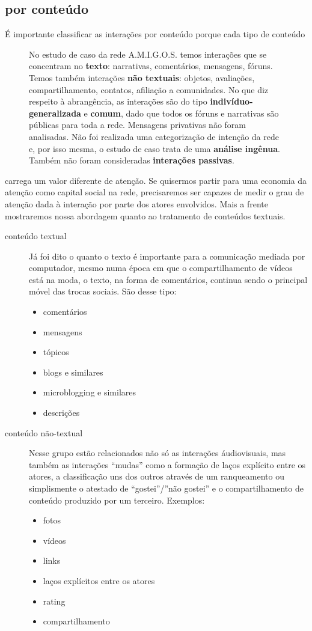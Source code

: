 \documentclass{article}
\begin{document}
\subsection{por conteúdo}
É importante classificar as interações por conteúdo porque cada tipo de conteúdo\begin{figure}
\begin{boxedminipage}{2in}
No estudo de caso da rede A.M.I.G.O.S. temos interações que se concentram no
\textbf{texto}: narrativas, comentários, mensagens, fóruns. Temos também
interações \textbf{não textuais}: objetos, avaliações, compartilhamento,
contatos, afiliação a comunidades. No que diz respeito à abrangência, as
interações são do tipo \textbf{indivíduo-generalizada} e \textbf{comum}, dado
que todos os fóruns e narrativas são públicas para toda a rede. Mensagens
privativas não foram analisadas. Não foi realizada uma categorização de
intenção da rede e, por isso mesma, o estudo de caso trata de uma
\textbf{análise ingênua}. Também não foram consideradas \textbf{interações
passivas}.
\end{boxedminipage}
\end{figure}carrega um valor diferente de atenção. Se quisermos partir para
uma economia da atenção como capital social na rede, precisaremos ser capazes
de medir o grau de atenção dada à interação por parte dos atores envolvidos.
Mais a frente mostraremos nossa abordagem quanto ao tratamento de conteúdos
textuais.
\begin{description}
\item[conteúdo textual] Já foi dito o quanto o texto é importante para a
comunicação mediada por computador, mesmo numa época em que o compartilhamento
de vídeos está na moda, o texto, na forma de comentários, continua sendo o
principal móvel das trocas sociais. São desse tipo:
\begin{itemize}
  \item comentários
  \item mensagens
  \item tópicos
  \item blogs e similares
  \item microblogging e similares
  \item descrições
\end{itemize}
\item[conteúdo não-textual] Nesse grupo estão relacionados não só as interações
áudiovisuais, mas também as interações ``mudas'' como a formação de laços
explícito entre os atores, a classificação uns dos outros através de um
ranqueamento ou simplismente o atestado de ``gostei''/''não gostei'' e o
compartilhamento de conteúdo produzido por um terceiro. Exemplos:
\begin{itemize}
  \item fotos
  \item vídeos
  \item links
  \item laços explícitos entre os atores
  \item rating
  \item compartilhamento
\end{itemize}
\end{description}
\end{document}
